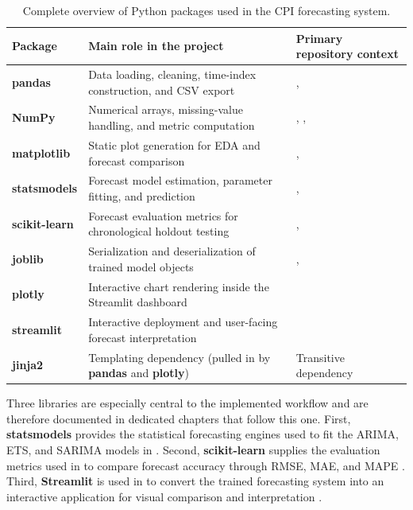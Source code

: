 \begin{table}[htbp]
    \centering
    \caption{Complete overview of Python packages used in the CPI forecasting system.}
    \label{tab:all-packages-overview}
    {\small
    \renewcommand{\arraystretch}{1.22}
    \setlength{\tabcolsep}{6pt}
    \begin{tabular}{L{2.6cm}L{4.8cm}L{5.5cm}}
        \hline
        Package & Main role in the project & Primary repository context \\
        \hline
        \textbf{pandas} & Data loading, cleaning, time-index construction, and CSV export & ,  \\
        \textbf{NumPy} & Numerical arrays, missing-value handling, and metric computation & , ,  \\
        \textbf{matplotlib} & Static plot generation for EDA and forecast comparison & ,  \\
        \textbf{statsmodels} & Forecast model estimation, parameter fitting, and prediction & ,  \\
        \textbf{scikit-learn} & Forecast evaluation metrics for chronological holdout testing & ,  \\
        \textbf{joblib} & Serialization and deserialization of trained model objects & ,  \\
        \textbf{plotly} & Interactive chart rendering inside the Streamlit dashboard &  \\
        \textbf{streamlit} & Interactive deployment and user-facing forecast interpretation &  \\
        \textbf{jinja2} & Templating dependency (pulled in by \textbf{pandas} and \textbf{plotly}) & Transitive dependency \\
        \hline
    \end{tabular}
    }
\end{table}

Three libraries are especially central to the implemented workflow and are therefore documented in dedicated chapters that follow this one. First, \textbf{statsmodels} provides the statistical forecasting engines used to fit the ARIMA, ETS, and SARIMA models in  \cite{statsmodels-doc}. Second, \textbf{scikit-learn} supplies the evaluation metrics used in  to compare forecast accuracy through RMSE, MAE, and MAPE \cite{scikit-learn-doc}. Third, \textbf{Streamlit} is used in  to convert the trained forecasting system into an interactive application for visual comparison and interpretation \cite{streamlit-doc}.

